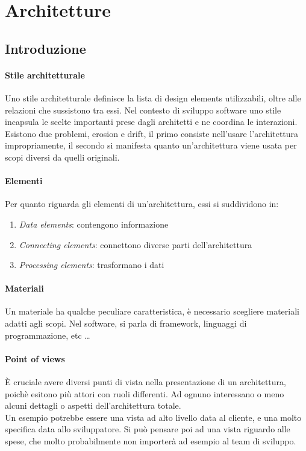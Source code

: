 \section{Architetture}
\subsection{Introduzione}

\paragraph{Stile architetturale}
Uno stile architetturale definisce la lista di design elements utilizzabili, 
oltre alle relazioni che sussistono tra essi. Nel contesto di sviluppo software 
uno stile incapsula le scelte importanti prese dagli architetti e ne coordina le 
interazioni.
Esistono due problemi, erosion e drift, il primo consiste nell'usare l'architettura 
impropriamente, il secondo si manifesta quanto un'architettura viene usata per scopi 
diversi da quelli originali.

\paragraph{Elementi}
Per quanto riguarda gli elementi di un'architettura, essi si suddividono in:
\begin{enumerate}
    \item \emph{Data elements}: contengono informazione
    \item \emph{Connecting elements}: connettono diverse parti dell'architettura
    \item \emph{Processing elements}: trasformano i dati
\end{enumerate}

\paragraph{Materiali}
Un materiale ha qualche peculiare caratteristica, è necessario scegliere materiali
adatti agli scopi. Nel software, si parla di framework, linguaggi di programmazione, etc \dots

\paragraph{Point of views}
È cruciale avere diversi punti di vista nella presentazione di un architettura, poichè 
esitono più attori con ruoli differenti.
Ad ognuno interessano o meno alcuni dettagli o aspetti dell'architettura totale.\\
Un esempio potrebbe essere una vista ad alto livello data al cliente, e una molto specifica 
data allo sviluppatore.
Si può pensare poi ad una vista riguardo alle spese, che molto probabilmente non importerà 
ad esempio al team di sviluppo. 

